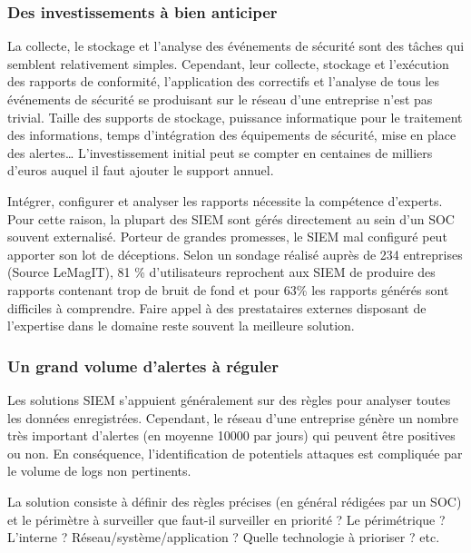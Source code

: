 \subsubsection{Des investissements à bien anticiper }

La collecte, le stockage et l’analyse des événements de sécurité sont des tâches qui semblent relativement simples. Cependant, leur collecte, stockage et l’exécution des rapports de conformité, l’application des correctifs et l’analyse de tous les événements de sécurité se produisant sur le réseau d’une entreprise n’est pas trivial. Taille des supports de stockage, puissance informatique pour le traitement des informations, temps d’intégration des équipements de sécurité, mise en place des alertes… L’investissement initial peut se compter en centaines de milliers d’euros auquel il faut ajouter le support annuel. 

Intégrer, configurer et analyser les rapports nécessite la compétence d’experts. Pour cette raison, la plupart des SIEM sont gérés directement au sein d’un SOC souvent externalisé. Porteur de grandes promesses, le SIEM mal configuré peut apporter son lot de déceptions. Selon un sondage réalisé auprès de 234 entreprises (Source LeMagIT), 81 \% d’utilisateurs reprochent aux SIEM de produire des rapports contenant trop de bruit de fond et pour 63\% les rapports générés sont difficiles à comprendre. Faire appel à des prestataires externes disposant de l’expertise dans le domaine reste souvent la meilleure solution.  


\subsubsection{Un grand volume d’alertes à réguler }

Les solutions SIEM s’appuient généralement sur des règles pour analyser toutes les données enregistrées. Cependant, le réseau d’une entreprise génère un nombre très important d'alertes (en moyenne 10000 par jours) qui peuvent être positives ou non. En conséquence, l’identification de potentiels attaques est compliquée par le volume de logs non pertinents. 

La solution consiste à définir des règles précises (en général rédigées par un SOC) et le périmètre à surveiller que faut-il surveiller en priorité ? Le périmétrique ? L’interne ? Réseau/système/application ? Quelle technologie à prioriser ? etc. 

